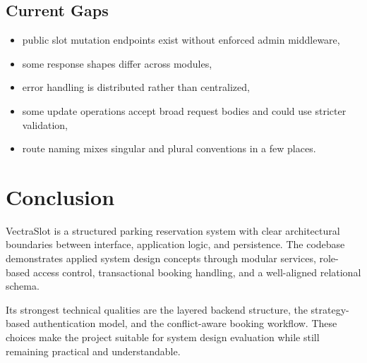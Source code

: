 \documentclass[12pt,a4paper]{article}
\begin{document}
\subsection{Current Gaps}
\begin{itemize}
    \item public slot mutation endpoints exist without enforced admin middleware,
    \item some response shapes differ across modules,
    \item error handling is distributed rather than centralized,
    \item some update operations accept broad request bodies and could use stricter validation,
    \item route naming mixes singular and plural conventions in a few places.
\end{itemize}

\section{Conclusion}
VectraSlot is a structured parking reservation system with clear architectural boundaries between interface, application logic, and persistence. The codebase demonstrates applied system design concepts through modular services, role-based access control, transactional booking handling, and a well-aligned relational schema.

Its strongest technical qualities are the layered backend structure, the strategy-based authentication model, and the conflict-aware booking workflow. These choices make the project suitable for system design evaluation while still remaining practical and understandable.
\end{document}
